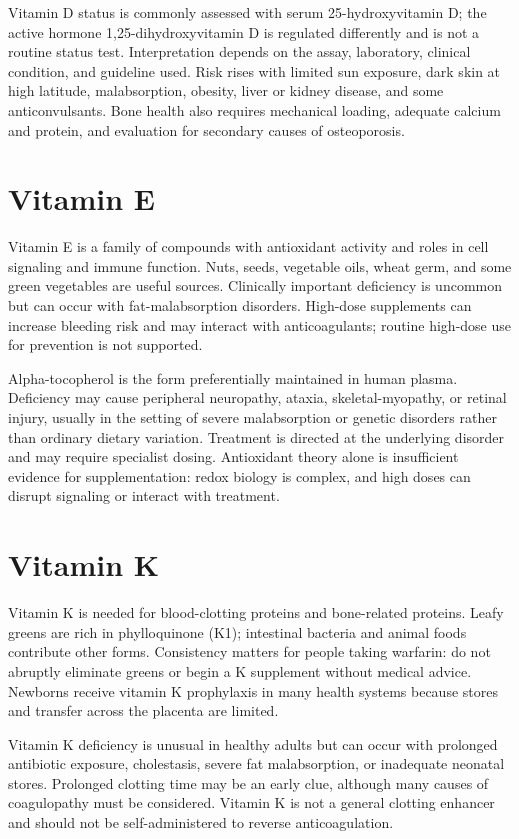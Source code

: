 Vitamin D status is commonly assessed with serum 25-hydroxyvitamin D; the active hormone 1,25-dihydroxyvitamin D is regulated differently and is not a routine status test. Interpretation depends on the assay, laboratory, clinical condition, and guideline used. Risk rises with limited sun exposure, dark skin at high latitude, malabsorption, obesity, liver or kidney disease, and some anticonvulsants. Bone health also requires mechanical loading, adequate calcium and protein, and evaluation for secondary causes of osteoporosis.

\section{Vitamin E}
Vitamin E is a family of compounds with antioxidant activity and roles in cell signaling and immune function. Nuts, seeds, vegetable oils, wheat germ, and some green vegetables are useful sources. Clinically important deficiency is uncommon but can occur with fat-malabsorption disorders. High-dose supplements can increase bleeding risk and may interact with anticoagulants; routine high-dose use for prevention is not supported.

Alpha-tocopherol is the form preferentially maintained in human plasma. Deficiency may cause peripheral neuropathy, ataxia, skeletal-myopathy, or retinal injury, usually in the setting of severe malabsorption or genetic disorders rather than ordinary dietary variation. Treatment is directed at the underlying disorder and may require specialist dosing. Antioxidant theory alone is insufficient evidence for supplementation: redox biology is complex, and high doses can disrupt signaling or interact with treatment.

\section{Vitamin K}
Vitamin K is needed for blood-clotting proteins and bone-related proteins. Leafy greens are rich in phylloquinone (K1); intestinal bacteria and animal foods contribute other forms. Consistency matters for people taking warfarin: do not abruptly eliminate greens or begin a K supplement without medical advice. Newborns receive vitamin K prophylaxis in many health systems because stores and transfer across the placenta are limited.

Vitamin K deficiency is unusual in healthy adults but can occur with prolonged antibiotic exposure, cholestasis, severe fat malabsorption, or inadequate neonatal stores. Prolonged clotting time may be an early clue, although many causes of coagulopathy must be considered. Vitamin K is not a general clotting enhancer and should not be self-administered to reverse anticoagulation.

